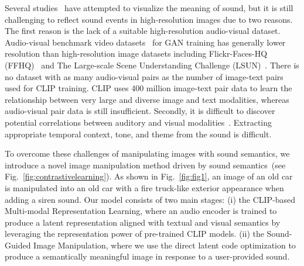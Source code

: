 \documentclass[10pt,twocolumn,letterpaper]{article}
\def\authornote#1#2#3{{\textcolor{#2}{\textsl{\small[#1: #3]}}}}
\newcommand{\wonmin}[1]{\authornote{Wonmin}{Blue}{#1}} %
\newcommand{\sang}[1]{\authornote{Sang}{Green}{#1}}
\begin{document}
 Several studies~\cite{chen2017deep, hao2018cmcgan, oh2019speech2face, qiu2018image, wan2019towards, zhu2021deep} have attempted to visualize the meaning of sound, but it is still challenging to reflect sound events in high-resolution images due to two reasons. 
 The first reason is the lack of a suitable high-resolution audio-visual dataset. Audio-visual benchmark video datasets~\cite{caba2015activitynet, kay2017kinetics, soomro2012ucf101} for GAN training has generally lower resolution than high-resolution image datasets including Flickr-Faces-HQ (FFHQ)~\cite{karras2019style} and The Large-scale Scene Understanding Challenge (LSUN)~\cite{yu2015lsun}. There is no dataset with as many audio-visual pairs as the number of image-text pairs used for CLIP training. CLIP uses 400 million image-text pair data to learn the relationship between very large and diverse image and text modalities, whereas audio-visual pair data is still insufficient. Secondly, it is difficult to discover potential correlations between auditory and visual modalities~\cite{zhu2021deep}. 
Extracting appropriate temporal context, tone, and theme from the sound is difficult.
 
 
To overcome these challenges of manipulating images with sound semantics, we introduce a novel image manipulation method driven by sound semantics~(see Fig.~\ref{fig:contrastivelearning}). As shown in Fig.~\ref{fig:fig1}, an image of an old car is manipulated into an old car with a fire truck-like exterior appearance when adding a siren sound. 
Our model consists of two main stages: (i) the CLIP-based Multi-modal Representation Learning, where an audio encoder is trained to produce a latent representation aligned with textual and visual semantics by leveraging the representation power of pre-trained CLIP models.
(ii) the Sound-Guided Image Manipulation, where we use the direct latent code optimization to produce a semantically meaningful image in response to a user-provided sound.
\end{document}
